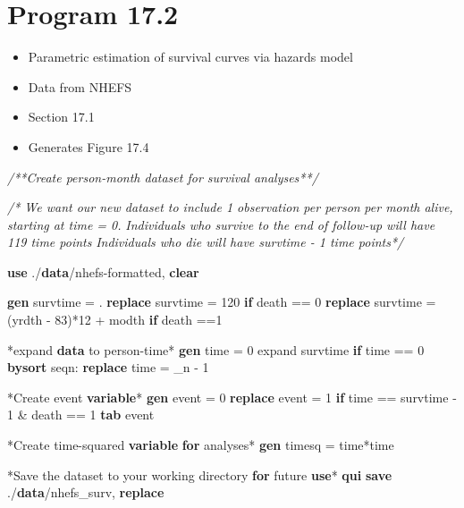 \documentclass[
  10pt,
]{book}
\newenvironment{Shaded}{\begin{snugshade}}{\end{snugshade}}
\newcommand{\CommentTok}[1]{\textcolor[rgb]{0.56,0.35,0.01}{\textit{#1}}}
\newcommand{\DataTypeTok}[1]{\textcolor[rgb]{0.13,0.29,0.53}{#1}}
\newcommand{\KeywordTok}[1]{\textcolor[rgb]{0.13,0.29,0.53}{\textbf{#1}}}
\newcommand{\NormalTok}[1]{#1}
\providecommand{\tightlist}{%
  \setlength{\itemsep}{0pt}\setlength{\parskip}{0pt}}
\begin{document}
\hypertarget{program-17.2}{%
\section{Program 17.2}\label{program-17.2}}

\begin{itemize}
\tightlist
\item
  Parametric estimation of survival curves via hazards model
\item
  Data from NHEFS
\item
  Section 17.1
\item
  Generates Figure 17.4
\end{itemize}

\begin{Shaded}
\begin{Highlighting}[]
\CommentTok{/**Create person-month dataset for survival analyses**/}

\CommentTok{/* We want our new dataset to include 1 observation per person }
\CommentTok{per month alive, starting at time = 0.}
\CommentTok{Individuals who survive to the end of follow-up will have }
\CommentTok{119 time points}
\CommentTok{Individuals who die will have survtime - 1 time points*/}

\KeywordTok{use}\NormalTok{ ./}\KeywordTok{data}\NormalTok{/nhefs-formatted, }\KeywordTok{clear}

\KeywordTok{gen}\NormalTok{ survtime = .}
\KeywordTok{replace}\NormalTok{ survtime = 120 }\KeywordTok{if}\NormalTok{ death == 0}
\KeywordTok{replace}\NormalTok{ survtime = (yrdth - 83)*12 + modth }\KeywordTok{if}\NormalTok{ death ==1}

\NormalTok{*expand }\KeywordTok{data}\NormalTok{ to person-time*}
\KeywordTok{gen}\NormalTok{ time = 0}
\NormalTok{expand survtime }\KeywordTok{if}\NormalTok{ time == 0}
\KeywordTok{bysort}\NormalTok{ seqn: }\KeywordTok{replace}\NormalTok{ time = }\DataTypeTok{_n}\NormalTok{ - 1}

\NormalTok{*Create event }\KeywordTok{variable}\NormalTok{*}
\KeywordTok{gen}\NormalTok{ event = 0}
\KeywordTok{replace}\NormalTok{ event = 1 }\KeywordTok{if}\NormalTok{ time == survtime - 1 & death == 1}
\KeywordTok{tab}\NormalTok{ event}

\NormalTok{*Create time-squared }\KeywordTok{variable} \KeywordTok{for}\NormalTok{ analyses*}
\KeywordTok{gen}\NormalTok{ timesq = time*time}

\NormalTok{*Save the dataset to your working directory }\KeywordTok{for}\NormalTok{ future }\KeywordTok{use}\NormalTok{*}
\KeywordTok{qui} \KeywordTok{save}\NormalTok{ ./}\KeywordTok{data}\NormalTok{/nhefs_surv, }\KeywordTok{replace}


\end{Highlighting}
\end{Shaded}
\end{document}
